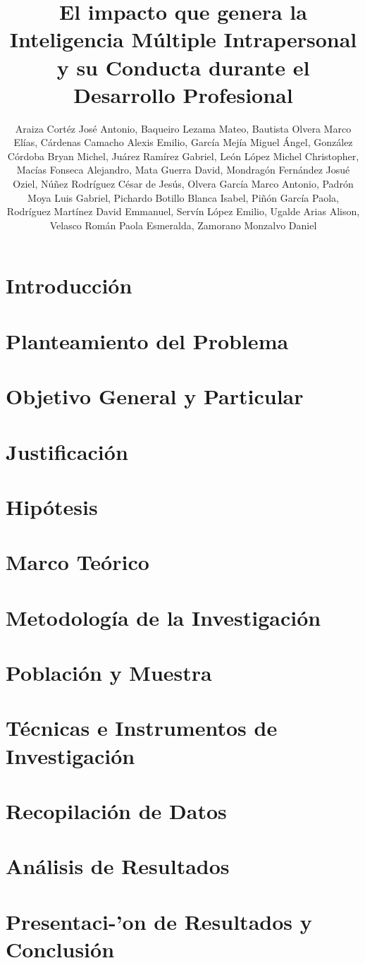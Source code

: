 \documentclass[stu,12pt]{apa7}
\affiliation{Facultad de Inform\'atica, Universidad Aut\'onoma de Quer\'etaro}
\title{El impacto que genera la Inteligencia M\'ultiple Intrapersonal y su
Conducta durante el Desarrollo Profesional}
\author{Araiza Cort\'ez Jos\'e Antonio, Baqueiro Lezama Mateo, Bautista Olvera
Marco El\'ias, C\'ardenas Camacho Alexis Emilio, Garc\'ia Mej\'ia Miguel
\'Angel, Gonz\'alez C\'ordoba Bryan Michel, Ju\'arez Ram\'irez Gabriel, Le\'on
L\'opez Michel Christopher, Mac\'ias Fonseca Alejandro, Mata Guerra David, 
Mondrag\'on Fern\'andez Josu\'e Oziel, N\'u\~nez Rodr\'iguez C\'esar de Jes\'us,
Olvera Garc\'ia Marco Antonio, Padr\'on Moya Luis Gabriel, Pichardo Botillo
Blanca Isabel, Pi\~n\'on Garc\'ia Paola, Rodr\'iguez Mart\'inez David Emmanuel,
Serv\'in L\'opez Emilio, Ugalde Arias Alison, Velasco Rom\'an Paola Esmeralda,
Zamorano Monzalvo Daniel}
\begin{document}
\maketitle
\tableofcontents
\section{Introducci\'on}

\section{Planteamiento del Problema}

\section{Objetivo General y Particular}

\section{Justificaci\'on}

\section{Hip\'otesis}

\section{Marco Te\'orico}

\section{Metodolog\'ia de la Investigaci\'on}

\section{Poblaci\'on y Muestra}

\section{T\'ecnicas e Instrumentos de Investigaci\'on}

\section{Recopilaci\'on de Datos}

\section{An\'alisis de Resultados}

\section{Presentaci-'on de Resultados y Conclusi\'on}

\begin{appendix}

\end{appendix}
\end{document}

